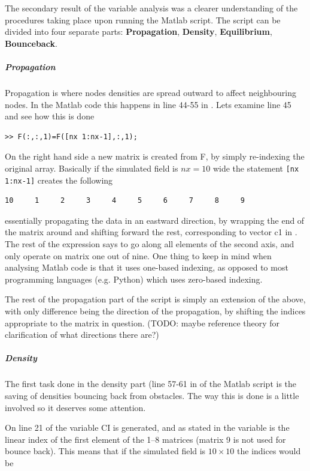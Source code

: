 The secondary result of the variable analysis was a clearer understanding of the procedures taking place upon running the Matlab script. The script can be divided into four separate parts: \textbf{Propagation}, \textbf{Density}, \textbf{Equilibrium}, \textbf{Bounceback}.

\subparagraph{Propagation} 
Propagation is where nodes densities are spread outward to affect neighbouring nodes. In the Matlab code this happens in line 44-55 in . Lets examine line 45 and see how this is done

\begin{verbatim}
>> F(:,:,1)=F([nx 1:nx-1],:,1);
\end{verbatim}

On the right hand side a new matrix is created from F, by simply re-indexing the original array. Basically if the simulated field is $nx=10$ wide the statement \texttt{[nx 1:nx-1]} creates the following

\begin{verbatim}
10     1     2     3     4     5     6     7     8     9
\end{verbatim}

essentially propagating the data in an eastward direction, by wrapping the end of the matrix around and shifting forward the rest, corresponding to vector c1 in . The rest of the expression says to go along all elements of the second axis, and only operate on matrix one out of nine. One thing to keep in mind when analysing Matlab code is that it uses one-based indexing, as opposed to most programming languages (e.g. Python) which uses zero-based indexing.

The rest of the propagation part of the script is simply an extension of the above, with only difference being the direction of the propagation, by shifting the indices appropriate to the matrix in question. (TODO: maybe reference theory for clarification of what directions there are?)

\subparagraph*{Density}
The first task done in the density part (line 57-61 in  of the Matlab script is the saving of densities bouncing back from obstacles. The way this is done is a little involved so it deserves some attention.

On line 21 of  the variable CI is generated, and as stated in  the variable is the linear index of the first element of the 1--8 matrices (matrix 9 is not used for bounce back). This means that if the simulated field is $10\times10$ the indices would be

